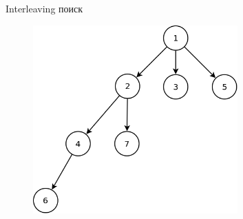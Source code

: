 \documentclass[10pt, mathserif]{beamer}
\theoremstyle{definition}
\begin{document}
\begin{frame}[fragile]{Interleaving поиск}
\begin{figure}
\centering
\includegraphics[width=0.7\textwidth]{interleave.png}
\end{figure}
\end{frame}


% 
% 
\end{document}
